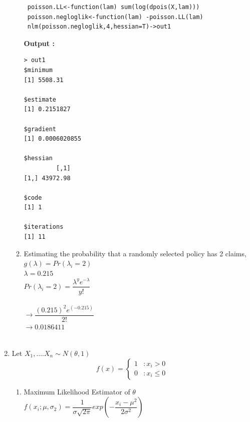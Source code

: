 \documentclass[11pt]{article}
\begin{document}
\begin{enumerate}
\begin{enumerate}
\begin{verbatim}
 poisson.LL<-function(lam) sum(log(dpois(X,lam)))
 poisson.negloglik<-function(lam) -poisson.LL(lam) 
 nlm(poisson.negloglik,4,hessian=T)->out1
\end{verbatim}

\textbf {Output :}
\begin{verbatim}
> out1
$minimum
[1] 5508.31

$estimate
[1] 0.2151827

$gradient
[1] 0.0006020855

$hessian
         [,1]
[1,] 43972.98

$code
[1] 1

$iterations
[1] 11
\end{verbatim}


\item Estimating the probability that a randomly selected policy has 2 claims,\\
$ g(\lambda) = Pr (\lambda_{i} = 2) $ \\

$ \lambda = 0.215 $\\

$ Pr(\lambda_{i} = 2) = \dfrac{\lambda^{y}e^{-\lambda}}{y!} $\\\\

$ \rightarrow \dfrac{(0.215)^{2} e^{(-0.215)}}{2!} $\\ 

$ \rightarrow  {0.0186411} $\\\\


\end{enumerate}


\item Let ${X_{1}},....{X_{n}} \sim N(\theta , 1) $\\

 \begin{displaymath}
f(x) = \left\{
\begin{array}{lr}
1 & : x_i > 0 \\
0 & : x_i \leq 0
\end{array}
\right.
\end{displaymath}


\begin{enumerate}

\item Maximum Likelihood Estimator of $\theta$\\

$ f({x_i};\mu ,\sigma_{2}) = \dfrac{1}{\sigma \sqrt{2\pi}} exp{(- \dfrac{{{x_i}-\mu}^2}{2\sigma^{2}})}$\\\\


\end{enumerate}
\end{enumerate}
\end{document}
